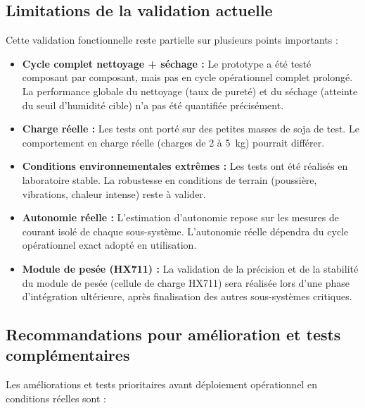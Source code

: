 \subsection{Limitations de la validation actuelle}

Cette validation fonctionnelle reste partielle sur plusieurs points importants :

\begin{itemize}
    \item \textbf{Cycle complet nettoyage + séchage :} Le prototype a été testé composant par composant, mais pas en cycle opérationnel complet prolongé. La performance globale du nettoyage (taux de pureté) et du séchage (atteinte du seuil d'humidité cible) n'a pas été quantifiée précisément.
    
    \item \textbf{Charge réelle :} Les tests ont porté sur des petites masses de soja de test. Le comportement en charge réelle (charges de 2 à 5~kg) pourrait différer.
    
    \item \textbf{Conditions environnementales extrêmes :} Les tests ont été réalisés en laboratoire stable. La robustesse en conditions de terrain (poussière, vibrations, chaleur intense) reste à valider.
    
    \item \textbf{Autonomie réelle :} L'estimation d'autonomie repose sur les mesures de courant isolé de chaque sous-système. L'autonomie réelle dépendra du cycle opérationnel exact adopté en utilisation.
    
    \item \textbf{Module de pesée (HX711) :} La validation de la précision et de la stabilité du module de pesée (cellule de charge HX711) sera réalisée lors d'une phase d'intégration ultérieure, après finalisation des autres sous-systèmes critiques.
\end{itemize}

\subsection{Recommandations pour amélioration et tests complémentaires}

Les améliorations et tests prioritaires avant déploiement opérationnel en conditions réelles sont :

